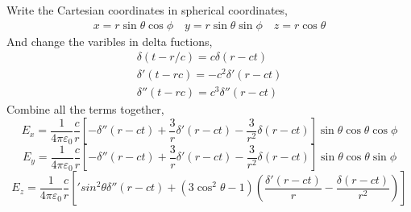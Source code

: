 \documentclass{article}
\begin{document}
Write the Cartesian coordinates in spherical coordinates,
\begin{align*}
  x=r\sin\theta\cos\phi\quad y=r\sin\theta\sin\phi\quad z=r\cos\theta
\end{align*}
And change the varibles in delta fuctions,
\begin{align*}
  \delta(t-r/c)=c\delta(r-ct)\\
  \delta'(t-rc)=-c^2\delta'(r-ct)\\
  \delta''(t-rc)=c^3\delta''(r-ct)
\end{align*}
Combine all the terms together,
\[ \boxed{E_x=\frac{1}{4\pi\varepsilon_0}\frac{c}{r}[-\delta''(r-ct)+\frac{3}{r}\delta'(r-ct)-\frac{3}{r^2}\delta(r-ct)]\sin\theta\cos\theta\cos\phi} \]
\[ \boxed{E_y=\frac{1}{4\pi\varepsilon_0}\frac{c}{r}[-\delta''(r-ct)+\frac{3}{r}\delta'(r-ct)-\frac{3}{r^2}\delta(r-ct)]\sin\theta\cos\theta\sin\phi} \]
\[ \boxed{E_z=\frac{1}{4\pi\varepsilon_0}\frac{c}{r}['sin^2\theta\delta''(r-ct)+(3\cos^2\theta-1)(\frac{\delta'(r-ct)}{r}-\frac{\delta(r-ct)}{r^2})]}\]
\end{document}
